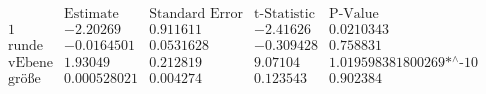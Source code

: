 \[\begin{array}{l|llll}
 \text{} & \text{Estimate} & \text{Standard Error} & \text{t-Statistic} & \text{P-Value} \\
\hline
 1 & -2.20269 & 0.911611 & -2.41626 & 0.0210343 \\
 \text{runde} & -0.0164501 & 0.0531628 & -0.309428 & 0.758831 \\
 \text{vEbene} & 1.93049 & 0.212819 & 9.07104 & \text{1.019598381800269$\grave{ }$*${}^{\wedge}$-10} \\
 \text{gr{\" o}{\ss}e} & 0.000528021 & 0.004274 & 0.123543 & 0.902384 \\
\end{array}\]

